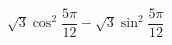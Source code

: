 \begin{ex}[type=type=expression]
	\begin{condition}
		\( \sqrt{3}\cos^2\dfrac{5\pi}{12}-\sqrt{3}\sin^2\dfrac{5\pi}{12} \)
	\end{condition}
\end{ex}